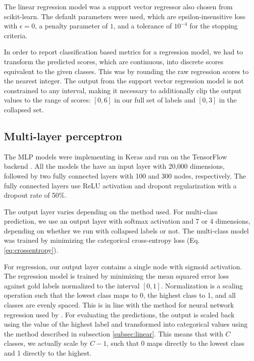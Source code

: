 The linear regression model was a support vector regressor also chosen from
scikit-learn. The default parameters were used, which are epsilon-insensitive
loss with $\epsilon=0$, a penalty parameter of $1$, and a tolerance of
$10^{-4}$ for the stopping criteria.

In order to report classification based metrics for a regression model, we
had to transform the predicted scores, which are continuous, into discrete
scores equivalent to the given classes. This was by rounding the raw
regression scores to the nearest integer. The output from the support vector
regression model is not constrained to any interval, making it necessary to
additionally clip the output values to the range of scores: $[0,6]$ in our
full set of labels and $[0,3]$ in the collapsed set.


\subsection{Multi-layer perceptron}
\label{subsec:mlp}

The MLP models were implementing in Keras \autocite{keras} and run on the
TensorFlow backend \autocite{tensorflow}. All the models the have an input
layer with 20,000 dimensions, followed by two fully connected layers with 100
and 300 nodes, respectively. The fully connected layers use \ac{ReLU}
activation and dropout regularization with a dropout rate of 50\%.

The output layer varies depending on the method used. For multi-class
prediction, we use an output layer with softmax activation and 7 or 4
dimensions, depending on whether we run with collapsed labels or not. The
multi-class model was trained by minimizing the categorical cross-entropy
loss (Eq. \ref{eq:crossentropy}).

For regression, our output layer contains a single node with sigmoid
activation. The regression model is trained by minimizing the mean squared
error loss against gold labels normalized to the interval $[0, 1]$.
Normalization is a scaling operation such that the lowest class maps to 0,
the highest class to 1, and all classes are evenly spaced. This is in line
with the method for neural network regression used by \textcite{taghipour16}.
For evaluating the predictions, the output is scaled back using the value of
the highest label and transformed into categorical values using the method
described in subsection \ref{subsec:linear}. This means that with $C$ classes,
we actually scale by $C-1$, such that 0 maps directly to the lowest class and
1 directly to the highest.

